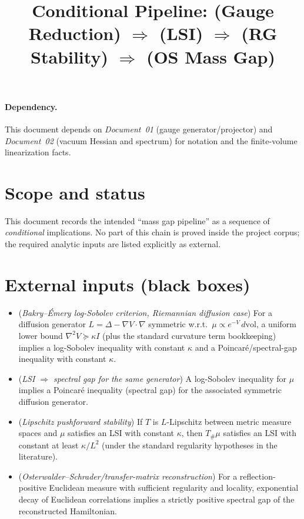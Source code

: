 \documentclass[11pt]{article}
\title{Conditional Pipeline: (Gauge Reduction) $\Rightarrow$ (LSI) $\Rightarrow$ (RG Stability) $\Rightarrow$ (OS Mass Gap)}
\date{}
\begin{document}
\maketitle

\paragraph{Dependency.}
This document depends on \emph{Document~01} (gauge generator/projector) and \emph{Document~02} (vacuum Hessian and spectrum) for notation and the finite-volume linearization facts.

\section{Scope and status}

This document records the intended ``mass gap pipeline'' as a sequence of \emph{conditional} implications.
No part of this chain is proved inside the project corpus; the required analytic inputs are listed explicitly as external.

\section{External inputs (black boxes)}

\begin{itemize}[leftmargin=*]
\item[\textbf{EI1}] (\emph{Bakry--\'Emery log-Sobolev criterion, Riemannian diffusion case})
For a diffusion generator $L=\Delta-\nabla V\cdot\nabla$ symmetric w.r.t.\ $\mu\propto e^{-V}\,d\mathrm{vol}$, a uniform lower bound $\nabla^2 V\succeq \kappa I$ (plus the standard curvature term bookkeeping) implies a log-Sobolev inequality with constant $\kappa$ and a Poincar\'e/spectral-gap inequality with constant $\kappa$.

\item[\textbf{EI2}] (\emph{LSI $\Rightarrow$ spectral gap for the same generator})
A log-Sobolev inequality for $\mu$ implies a Poincar\'e inequality (spectral gap) for the associated symmetric diffusion generator.

\item[\textbf{EI3}] (\emph{Lipschitz pushforward stability})
If $T$ is $L$-Lipschitz between metric measure spaces and $\mu$ satisfies an LSI with constant $\kappa$, then $T_\#\mu$ satisfies an LSI with constant at least $\kappa/L^2$ (under the standard regularity hypotheses in the literature).

\item[\textbf{EI4}] (\emph{Osterwalder--Schrader/transfer-matrix reconstruction})
For a reflection-positive Euclidean measure with sufficient regularity and locality, exponential decay of Euclidean correlations implies a strictly positive spectral gap of the reconstructed Hamiltonian.

\end{itemize}
\end{document}
